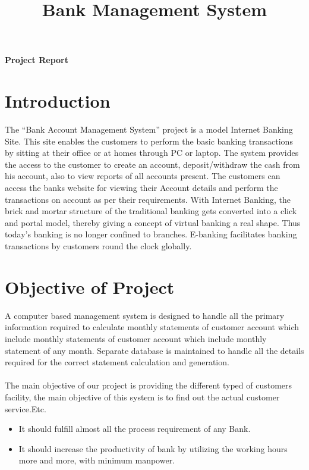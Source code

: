 \documentclass[12pt,a4 paper]{article}
\title{Bank Management System}
\begin{document}
\maketitle
\begin{center}
\textbf{Project Report}
\end{center}
\section{Introduction}
The “Bank Account Management System” project is a model Internet Banking Site. This site enables the customers to perform the basic banking transactions by sitting at their office or at homes through PC or laptop. The system provides the access to the customer to create an account, deposit/withdraw the cash from his account, also to view reports of all accounts present. The customers can access the banks website for viewing their Account details and perform the transactions on account as per their requirements. With Internet Banking, the brick and mortar structure of the traditional banking gets converted into a click and portal model, thereby giving a concept of virtual banking a real shape. Thus today's banking is no longer confined to branches. E-banking facilitates banking transactions by customers round the clock globally. 
\section{Objective of Project}
A computer based management system is designed to handle all the primary information required to calculate monthly statements of customer account which include monthly statements of customer account which include monthly statement of any month. Separate database is maintained to handle all the details required for the correct statement calculation and generation.\\
\\
The main objective of our project is providing the different typed of customers facility, the main objective of this system is to find out the actual customer service.Etc.\\
\begin{itemize}
\item It should fulfill almost all the process requirement of any Bank. 
\item It should increase the productivity of bank by utilizing the working hours more and more, with minimum manpower.
\end{itemize}
\end{document}
